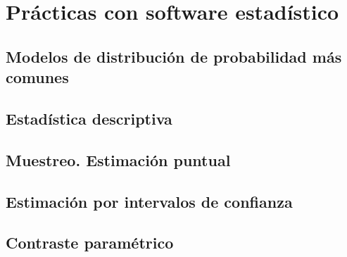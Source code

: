 \documentclass[a4paper]{book}
\begin{document}
\chapter{Prácticas con software estadístico}


\section{Modelos de distribución de probabilidad más comunes}

\section{Estadística descriptiva}

\section{Muestreo. Estimación puntual}

\section{Estimación por intervalos de confianza}

\section{Contraste paramétrico}



% 
\end{document}
